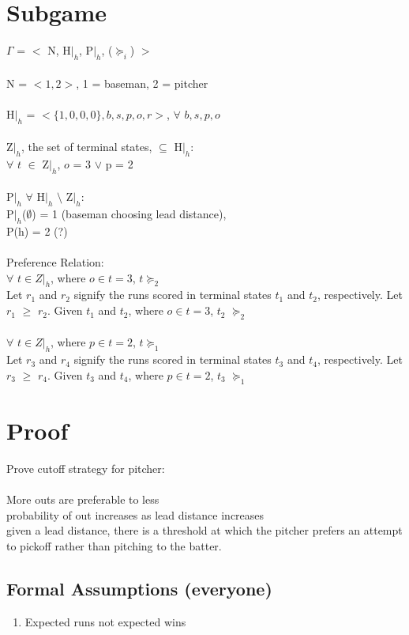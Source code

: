 \documentclass{article}
\begin{document}
\section{Subgame}
$\Gamma$ = $<$ N, H$|_h$, P$|_h$, ($\succeq_i$) $>$ \\\\
N = $<1,2>$, 1 = baseman, 2 = pitcher \\\\
H$|_h$ = $< \{1,0,0,0\}, b, s, p, o, r >$, $\forall$ $b,s,p,o$ \\\\
Z$|_h$, the set of terminal states, $\subseteq$ H$|_h$: \\
$\forall$ $t$ $\in$ Z$|_h$, $o$ = 3 $\lor$ p = 2 \\\\
P$|_h$ $\forall$ H$|_h$ $\setminus$ Z$|_h$: \\
P$|_h$($\emptyset$) = 1 (baseman choosing lead distance), \\P(h) = 2 (?) \\\\
Preference Relation: \\
$\forall$ $t \in Z|_h$, where $o \in t = 3$, $t \succeq_2$\\
Let $r_1$ and $r_2$ signify the runs scored in terminal states $t_1$ and $t_2$, respectively. Let $r_1$ $\geq$ $r_2$. Given $t_1$ and $t_2$, where $o \in t = 3$, $t_2$ $\succeq_2$ \\\\
$\forall$ $t \in Z|_h$, where $p \in t = 2$, $t \succeq_1$\\
Let $r_3$ and $r_4$ signify the runs scored in terminal states $t_3$ and $t_4$, respectively. Let $r_3$ $\geq$ $r_4$. Given $t_3$ and $t_4$, where $p \in t = 2$, $t_3$ $\succeq_1$ \\

\section{Proof}
Prove cutoff strategy for pitcher: \\\\
More outs are preferable to less\\
probability of out increases as lead distance increases \\
given a lead distance, there is a threshold at which the pitcher prefers an attempt to pickoff rather than pitching to the batter. \\
\subsection{Formal Assumptions (everyone) }
\begin{enumerate}
    \item Expected runs not expected wins
\end{enumerate}
\end{document}
